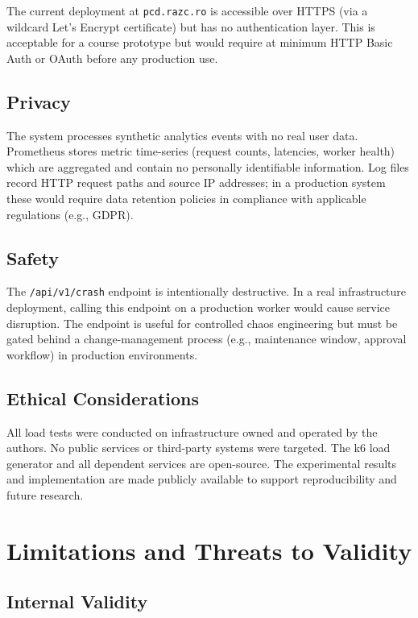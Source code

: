 \documentclass[conference]{IEEEtran}
\begin{document}
The current deployment at \texttt{pcd.razc.ro} is accessible over
HTTPS (via a wildcard Let's Encrypt certificate) but has no
authentication layer. This is acceptable for a course prototype but
would require at minimum HTTP Basic Auth or OAuth before any production use.

\subsection{Privacy}

The system processes synthetic analytics events with no real user
data. Prometheus stores metric time-series (request counts, latencies,
worker health) which are aggregated and contain no personally
identifiable information. Log files record HTTP request paths and
source IP addresses; in a production system these would require data
retention policies in compliance with applicable regulations (e.g., GDPR).

\subsection{Safety}

The \texttt{/api/v1/crash} endpoint is intentionally destructive.
In a real infrastructure deployment, calling this endpoint on a
production worker would cause service disruption. The endpoint is
useful for controlled chaos engineering but must be gated behind
a change-management process (e.g., maintenance window, approval
workflow) in production environments.

\subsection{Ethical Considerations}

All load tests were conducted on infrastructure owned and operated
by the authors. No public services or third-party systems were targeted.
The k6 load generator and all dependent services are open-source.
The experimental results and implementation are made publicly available
to support reproducibility and future research.

\section{Limitations and Threats to Validity}

\subsection{Internal Validity}
\end{document}
